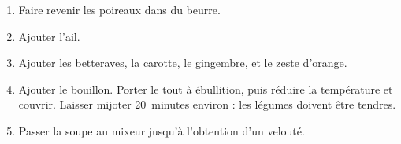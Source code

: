 
\begin{ingredients}
\end{ingredients}


\begin{recipe}
  \begin{enumerate}

  \item Faire revenir les poireaux dans du beurre.

  \item Ajouter l'ail.  

  \item Ajouter les betteraves, la carotte, le gingembre, et le zeste
    d'orange.

  \item Ajouter le bouillon.  Porter le tout \`a \'ebullition, puis
    r\'eduire la temp\'erature et couvrir.  Laisser mijoter 20~minutes
    environ : les l\'egumes doivent \^etre tendres.
    
  \item Passer la soupe au mixeur jusqu'\`a l'obtention d'un
    velout\'e.

  \end{enumerate}
\end{recipe}
